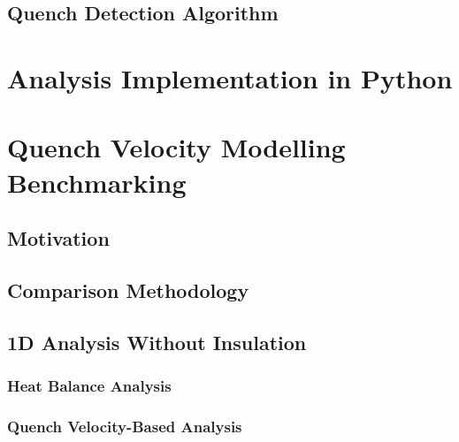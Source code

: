 \documentclass{article}
\begin{document}
\subsection{Quench Detection Algorithm}
\label{subsection:quench_detection_algorithm}


\clearpage
\section{Analysis Implementation in Python}
\label{section:python_implementation}
% 

\clearpage
\section{Quench Velocity Modelling Benchmarking}
\label{section:quench_velocity_benchmarking}

\subsection{Motivation}


\subsection{Comparison Methodology}


\subsection{1D Analysis Without Insulation}
\label{subsection:quench_velocity_benchmarking_no_insulation}

\subsubsection{Heat Balance Analysis}
\label{subsection:quench_velocity_benchmarking_no_insulation_heat_balance}


\subsubsection{Quench Velocity-Based Analysis}
\label{subsection:quench_velocity_benchmarking_no_insulation_quench_velocity}

\end{document}
